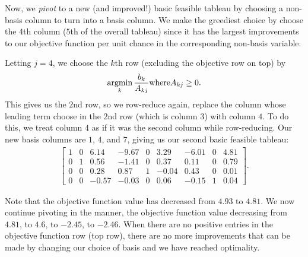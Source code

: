 Now, we \emph{pivot} to a new (and improved!) basic feasible tableau by choosing a non-basis column to turn into a basis column. We make the greediest choice by choose the $4$th column ($5$th of the overall tableau) since it has the largest improvements to our objective function per unit chance in the corresponding non-basis variable.

Letting $j = 4$, we choose the $k$th row (excluding the objective row on top) by \[\operatorname*{argmin}_{k}\frac{b_k}{A_{kj}} \mathrm{ where } A_{kj} \geq 0.\] This gives us the $2$nd row, so we row-reduce again, replace the column whose leading term choose in the $2$nd row (which is column $3$) with column $4$. To do this, we treat column $4$ as if it was the second column while row-reducing. Our new basis columns are $1$, $4$, and $7$, giving us our second basic feasible tableau:
\begin{align*}
    \left[\begin{array}{c|ccccccc|c}
        1 & 0 & 6.14  & -9.67 & 0 & 3.29  & -6.01 & 0 & 4.81 \\
        \hline
        0 & 1 & 0.56  & -1.41 & 0 & 0.37  & 0.11  & 0 & 0.79 \\
        0 & 0 & 0.28  & 0.87  & 1 & -0.04 & 0.43  & 0 & 0.01 \\
        0 & 0 & -0.57 & -0.03 & 0 & 0.06  & -0.15 & 1 & 0.04
    \end{array}\right].
\end{align*}

Note that the objective function value has decreased from $4.93$ to $4.81$. We now continue pivoting in the manner, the objective function value decreasing from $4.81$, to $4.6$, to $-2.45$, to $-2.46$. When there are no positive entries in the objective function row (top row), there are no more improvements that can be made by changing our choice of basis and we have reached optimality.
